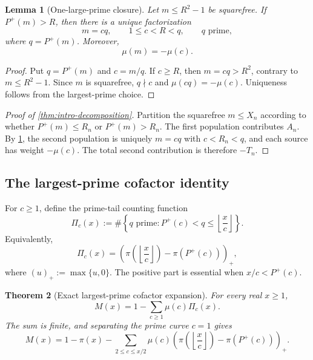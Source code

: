 \documentclass[11pt]{article}
\newtheorem{theorem}{Theorem}[section]
\newtheorem{lemma}[theorem]{Lemma}
\theoremstyle{definition}
\theoremstyle{remark}
\newcommand{\Pplus}{P^{+}}
\newcommand{\1}{\mathbf{1}}
\begin{document}
\begin{lemma}[One-large-prime closure]
\label{lem:one-large}
Let $m\le R^2-1$ be squarefree.  If $\Pplus(m)>R$, then there is a unique factorization
\begin{equation}
 m=cq,
 \qquad
 1\le c<R<q,
 \qquad
 q\text{ prime},
 \label{eq:one-large}
\end{equation}
where $q=\Pplus(m)$.  Moreover,
\begin{equation}
 \mu(m)=-\mu(c).
 \label{eq:mobius-peel}
\end{equation}
\end{lemma}

\begin{proof}
Put $q=\Pplus(m)$ and $c=m/q$.  If $c\ge R$, then $m=cq>R^2$, contrary to $m\le R^2-1$.  Since $m$ is squarefree, $q\nmid c$ and $\mu(cq)=-\mu(c)$.  Uniqueness follows from the largest-prime choice.
\end{proof}

\begin{proof}[Proof of \cref{thm:intro-decomposition}]
Partition the squarefree $m\le X_n$ according to whether $\Pplus(m)\le R_n$ or $\Pplus(m)>R_n$.  The first population contributes $A_n$.  By \cref{lem:one-large}, the second population is uniquely $m=cq$ with $c<R_n<q$, and each source has weight $-\mu(c)$.  The total second contribution is therefore $-T_n$.
\end{proof}


\subsection{The largest-prime cofactor identity}
\label{subsec:central-identity}

For $c\ge1$, define the prime-tail counting function
\begin{equation}
 \Pi_c(x)
 :=
 \#\left\{
 q\text{ prime}:
 \Pplus(c)<q\le\left\lfloor\frac{x}{c}\right\rfloor
 \right\}.
 \label{eq:Pi-c}
\end{equation}
Equivalently,
\begin{equation}
 \Pi_c(x)
 =
 \left(
 \pi\!\left(\left\lfloor\frac{x}{c}\right\rfloor\right)
 -\pi(\Pplus(c))
 \right)_{+},
 \label{eq:Pi-c-positive-part}
\end{equation}
where $(u)_+:=\max\{u,0\}$.  The positive part is essential when
$x/c<\Pplus(c)$.

\begin{theorem}[Exact largest-prime cofactor expansion]
\label{thm:central-M-identity}
For every real $x\ge1$,
\begin{equation}
 \boxed{
 M(x)
 =
 1-\sum_{c\ge1}\mu(c)\Pi_c(x).
 }
 \label{eq:central-M-identity-compact}
\end{equation}
The sum is finite, and separating the prime curve $c=1$ gives
\begin{equation}
 \boxed{
 M(x)
 =
 1-\pi(x)
 -\sum_{2\le c\le x/2}
 \mu(c)
 \left(
 \pi\!\left(\left\lfloor\frac{x}{c}\right\rfloor\right)
 -\pi(\Pplus(c))
 \right)_{+}.
 }
 \label{eq:central-M-identity}
\end{equation}
\end{theorem}
\end{document}
